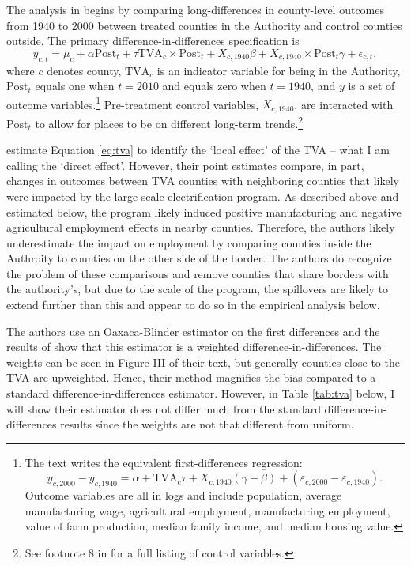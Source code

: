 \documentclass[11pt]{article}
\begin{document}
The analysis in \citet{Kline_Moretti_2014} begins by comparing long-differences in county-level outcomes from 1940 to 2000 between treated counties in the Authority and control counties outside. The primary difference-in-differences specification is
\begin{equation}\label{eq:tva}
    y_{c, t} = \mu_c + \alpha \text{Post}_t + \tau \text{TVA}_c \times \text{Post}_t + X_{c, 1940} \beta + X_{c, 1940} \times \text{Post}_t \gamma + \epsilon_{c,t},
\end{equation}
where $c$ denotes county, $\text{TVA}_c$ is an indicator variable for being in the Authority, $\text{Post}_t$ equals one when $t = 2010$ and equals zero when $t = 1940$, and $y$ is a set of outcome variables.\footnote{The text writes the equivalent first-differences regression: \[ 
    y_{c, 2000} - y_{c, 1940} = \alpha + \text{TVA}_c \tau + X_{c, 1940} (\gamma - \beta) + (\varepsilon_{c, 2000} - \varepsilon_{c, 1940}). 
\] Outcome variables are all in logs and include population, average manufacturing wage, agricultural employment, manufacturing employment, value of farm production, median family income, and median housing value.} Pre-treatment control variables, $X_{c,1940}$, are interacted with $\text{Post}_t$ to allow for places to be on different long-term trends.\footnote{See footnote 8 in \citet{Kline_Moretti_2014} for a full listing of control variables.} 

\citet{Kline_Moretti_2014} estimate Equation \ref{eq:tva} to identify the `local effect' of the TVA -- what I am calling the `direct effect'. However, their point estimates compare, in part, changes in outcomes between TVA counties with neighboring counties that likely were impacted by the large-scale electrification program. As described above and estimated below, the program likely induced positive manufacturing and negative agricultural employment effects in nearby counties. Therefore, the authors likely underestimate the impact on employment by comparing counties inside the Authroity to counties on the other side of the border. The authors do recognize the problem of these comparisons and remove counties that share borders with the authority's, but due to the scale of the program, the spillovers are likely to extend further than this and appear to do so in the empirical analysis below.  

The authors use an Oaxaca-Blinder estimator on the first differences and the results of \citet{Kline_2011} show that this estimator is a weighted difference-in-differences. The weights can be seen in Figure III of their text, but generally counties close to the TVA are upweighted. Hence, their method magnifies the bias compared to a standard difference-in-differences estimator.  However, in Table \ref{tab:tva} below, I will show their estimator does not differ much from the standard difference-in-differences results since the weights are not that different from uniform. 
\end{document}
